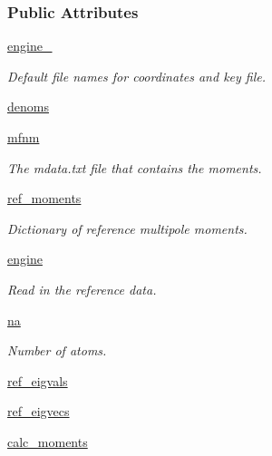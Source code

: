 \subsubsection*{Public Attributes}
\begin{DoxyCompactItemize}
\item 
\hyperlink{classforcebalance_1_1tinkerio_1_1Moments__TINKER_a17ffd3b75c45ac3f701f5d3022c0a76b}{engine\-\_\-}
\begin{DoxyCompactList}\small\item\em Default file names for coordinates and key file. \end{DoxyCompactList}\item 
\hyperlink{classforcebalance_1_1moments_1_1Moments_af8711c91b434e0c8a54a6e4c96e58f3b}{denoms}
\item 
\hyperlink{classforcebalance_1_1moments_1_1Moments_ab9cf14ace681ac05db60b368b7726311}{mfnm}
\begin{DoxyCompactList}\small\item\em The mdata.\-txt file that contains the moments. \end{DoxyCompactList}\item 
\hyperlink{classforcebalance_1_1moments_1_1Moments_a482e5ec495c5466d32de15a97758a63c}{ref\-\_\-moments}
\begin{DoxyCompactList}\small\item\em Dictionary of reference multipole moments. \end{DoxyCompactList}\item 
\hyperlink{classforcebalance_1_1moments_1_1Moments_a5066d63381229cf44dd520b94e6b4d54}{engine}
\begin{DoxyCompactList}\small\item\em Read in the reference data. \end{DoxyCompactList}\item 
\hyperlink{classforcebalance_1_1moments_1_1Moments_ab04edfe986c2fc46d11af156d76a7b2f}{na}
\begin{DoxyCompactList}\small\item\em Number of atoms. \end{DoxyCompactList}\item 
\hyperlink{classforcebalance_1_1moments_1_1Moments_ada9ac5bee6884a031f7db7ad00331649}{ref\-\_\-eigvals}
\item 
\hyperlink{classforcebalance_1_1moments_1_1Moments_ad0da4538b3e3fe86eba5c326ccebd7a6}{ref\-\_\-eigvecs}
\item 
\hyperlink{classforcebalance_1_1moments_1_1Moments_a0b71c05c5ddbea8f0990879abd604aec}{calc\-\_\-moments}

\end{DoxyCompactItemize}
